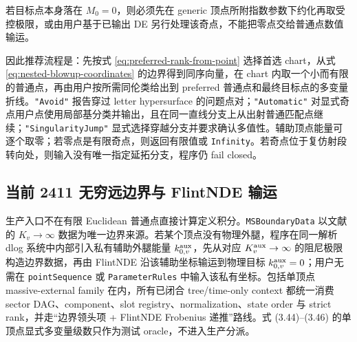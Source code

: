 \documentclass[11pt,a4paper]{ctexart}
\begin{document}
若目标点本身落在 $M_0=0$，则必须先在 generic 顶点所附指数参数下约化再取受控极限，或由用户基于已输出 DE 另行处理该奇点，不能把零点交给普通点数值输运。

因此推荐流程是：先按式 \eqref{eq:preferred-rank-from-point} 选择首选 chart，从式 \eqref{eq:nested-blowup-coordinates} 的边界得到同序向量，在 chart 内取一个小而有限的普通点，再由用户按所需同伦类给出到 preferred 普通点和最终目标点的多变量折线。\texttt{"Avoid"} 报告穿过 letter hypersurface 的问题点对；\texttt{"Automatic"} 对显式奇点用户点使用局部基分类并输出，且在同一直线分支上从出射普通匹配点继续；\texttt{"SingularityJump"} 显式选择穿越分支并要求确认多值性。辅助顶点能量可逐个取零；若零点是有限奇点，则返回有限值或 \texttt{Infinity}。若奇点位于复仿射段转向处，则输入没有唯一指定延拓分支，程序仍 fail closed。

\subsection{当前 2411 无穷远边界与 FlintNDE 输运}

生产入口不在有限 Euclidean 普通点直接计算定义积分。\texttt{MSBoundaryData} 以文献 \cite{Chen:2024jms} 的 $K_v\to\infty$ 数据为唯一边界来源。若某个顶点没有物理外腿，程序在同一解析 dlog 系统中内部引入私有辅助外腿能量 $k_{0,v}^{\rm aux}$，先从对应 $K_v^{\rm aux}\to\infty$ 的阻尼极限构造边界数据，再由 FlintNDE 沿该辅助坐标输运到物理目标 $k_{0,v}^{\rm aux}=0$；用户无需在 \texttt{pointSequence} 或 \texttt{ParameterRules} 中输入该私有坐标。包括单顶点 massive-external family 在内，所有已闭合 tree/time-only context 都统一消费 sector DAG、component、slot registry、normalization、state order 与 strict rank，并走“边界领头项 + FlintNDE Frobenius 递推”路线。式 (3.44)--(3.46) 的单顶点显式多变量级数只作为测试 oracle，不进入生产分派。
\end{document}
